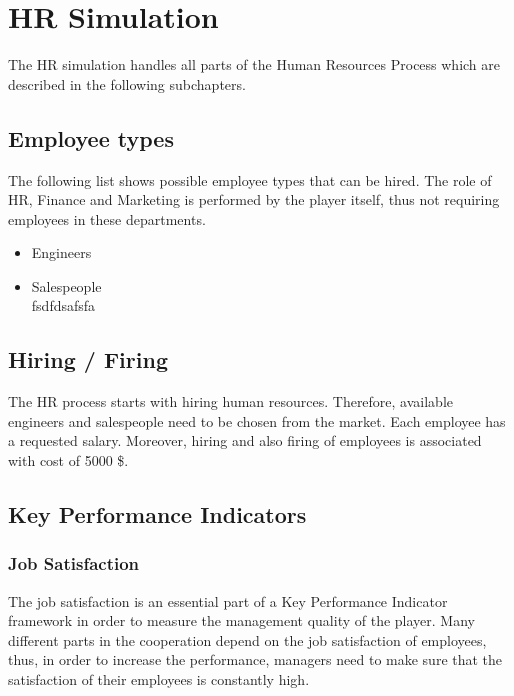 \section{HR Simulation}
\label{sec:HRsim}
The HR simulation handles all parts of the Human Resources Process which are described in the following subchapters.
\subsection{Employee types}
The following list shows possible employee types that can be hired. The role of HR, Finance and Marketing is performed by the player itself, thus not requiring employees in these departments.
\begin{itemize}
    \item Engineers %
    \item Salespeople \\
    fsdfdsafsfa
\end{itemize}

\subsection{Hiring / Firing}
The HR process starts with hiring human resources. Therefore, available engineers and salespeople need to be chosen from the market. Each employee has a requested salary. Moreover, hiring and also firing of employees is associated with cost of 5000 \$. \cite{recruiterbox}

\subsection{Key Performance Indicators}
\label{sub:KPI}
\subsubsection{Job Satisfaction}
The job satisfaction is an essential part of a Key Performance Indicator framework in order to measure the management quality of the player. Many different parts in the cooperation depend on the job satisfaction of employees, thus, in order to increase the performance, managers need to make sure that the satisfaction of their employees is constantly high.\cite{KOYS}

